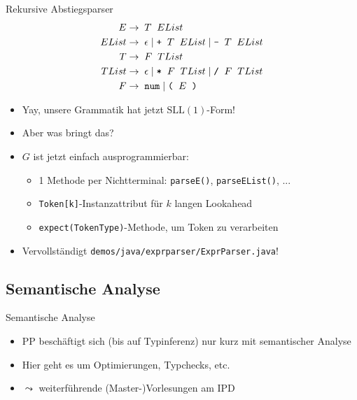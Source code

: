 \documentclass{beamer}
\begin{document}
\begin{frame}{Rekursive Abstiegsparser}
	\footnotesize
	\begin{align*}
		E     \to & \;\; T \;\; EList\\
		EList \to & \;\; \epsilon \mid \textrm{\texttt{+}} \;\; T \;\; EList \mid \textrm{\texttt{-}} \;\; T \;\; EList\\
		T     \to & \;\; F \;\; TList\\
		TList \to & \;\; \epsilon \mid \textrm{\texttt{*}} \;\; F \;\; TList \mid \textrm{\texttt{/}} \;\; F \;\; TList\\
		F \to & \;\; \textrm{\texttt{num}} \; | \; \textrm{\texttt{(}} \;\; E \;\; \textrm{\texttt{)}}
	\end{align*}
	\begin{itemize}
		\item Yay, unsere Grammatik hat jetzt $\textrm{SLL}(1)$-Form!
		\item Aber was bringt das?
		\pause
		\item $G$ ist jetzt einfach ausprogrammierbar:
		\begin{itemize}
			\item 1 Methode per Nichtterminal: \texttt{parseE()}, \texttt{parseEList()}, ...
			\item \texttt{Token[k]}-Instanzattribut für $k$ langen Lookahead
			\item \texttt{expect(TokenType)}-Methode, um Token zu verarbeiten
		\end{itemize}
		\pause
		\item Vervollständigt \texttt{demos/java/exprparser/ExprParser.java}!
	\end{itemize}
\end{frame}

\subsection{Semantische Analyse}

\begin{frame}{Semantische Analyse}
	\begin{itemize}
		\item PP beschäftigt sich (bis auf Typinferenz) nur kurz mit semantischer Analyse
		\item Hier geht es um Optimierungen, Typchecks, etc.
		\item $\leadsto$ weiterführende (Master-)Vorlesungen am IPD
	\end{itemize}
\end{frame}
\end{document}
